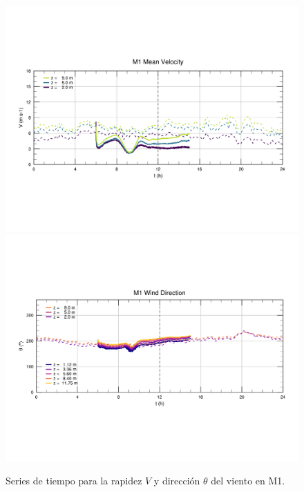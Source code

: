 \begin{figure}[H]
	\centering
	\includegraphics[width=0.87\linewidth,page=1,trim={9mm 57mm 10mm 60mm},clip]{Imagenes/06/bol/ts_interpol_compare.pdf}\\%
	\includegraphics[width=0.87\linewidth,page=1,trim={12mm 52mm 10mm 60mm},clip]{Imagenes/06/bol/ts_interpol_compare_o.pdf}%
	\vspace{-2mm}\caption{Series de tiempo para la rapidez $V$ y dirección $\theta$ del viento en M1.}
	\label{fig:06_bol_ts_m1}
\end{figure}

